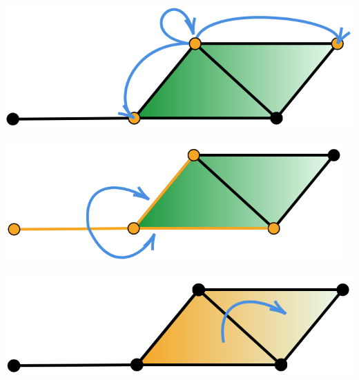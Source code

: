 \documentclass[landscape,a0paper,blockverticalspace = 5mm]{tikzposter}
\begin{document}
\begin{columns}
{{\begin{center}
  \begin{minipage}{0.2\linewidth}
    \begin{center}
      \includegraphics[height=4.8cm]{figures/glap0.png}
    \end{center}
  \end{minipage}
  \hspace{4.5cm}
  \begin{minipage}{0.2\linewidth}
    \begin{center}
      \vspace{1.5cm}
      \includegraphics[height=4.58cm]{figures/glap1.png}
    \end{center}
  \end{minipage}
  \hspace{4.5cm}
  \begin{minipage}{0.2\linewidth}
    \begin{center}
      \vspace{0.1cm}
      \includegraphics[height=3.9cm]{figures/glap2.png}
    \end{center}
  \end{minipage}
\end{center}
}


}
\end{columns}
\end{document}
